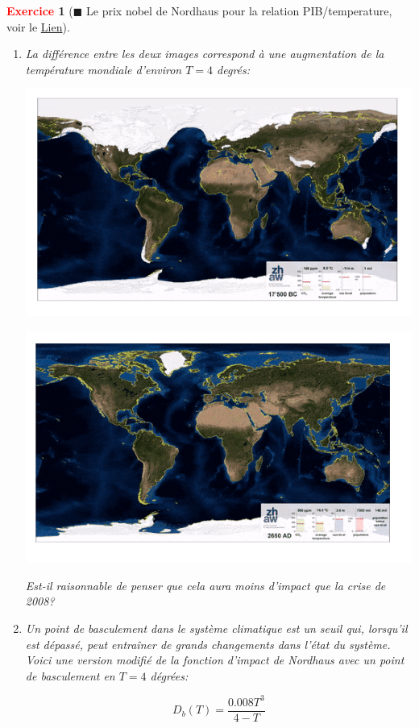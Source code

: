 \documentclass[11pt]{article}
\theoremstyle{mythmstyle}
\newtheorem{exo}{\textcolor{red}{\textbf{Exercice}}}
\begin{document}
\begin{exo}[$\blacksquare$ Le prix nobel de Nordhaus pour la relation PIB/temperature, voir le \href{https://www.youtube.com/watch?v=vwwvZ8g5eHE}{Lien}]
\begin{enumerate}
\item La différence entre les deux images correspond à une augmentation de la température mondiale d'environ $T=4$ degrés:

\begin{center}
    \includegraphics[scale=0.5]{before}
\end{center}

\begin{center}
    \includegraphics[scale=0.5]{now}
\end{center}


Est-il raisonnable de penser que cela aura moins d'impact que la crise de 2008?
\medskip


\item Un point de basculement dans le système climatique est un seuil qui, lorsqu'il est dépassé, peut entraîner de grands changements dans l'état du système.  Voici une version modifié de la fonction d'impact de Nordhaus avec un point de basculement en $T=4$ dégrées:

$$
D_b(T)= \frac{0.008 T^3}{4-T}
$$


\end{enumerate}
\end{exo}
\end{document}
